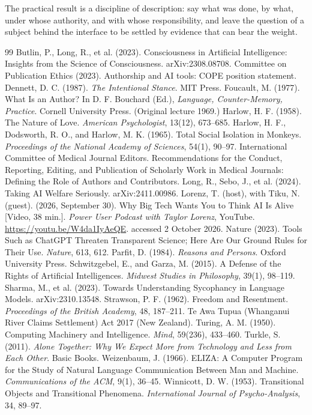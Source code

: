 \documentclass[11pt]{article}
\begin{document}
The practical result is a discipline of description: say what was done, by what, under whose authority, and with whose responsibility, and leave the question of a subject behind the interface to be settled by evidence that can bear the weight.

\begin{thebibliography}{99}\small
\setlength{\itemsep}{0.2em}
 Butlin, P., Long, R., et al. (2023). Consciousness in Artificial Intelligence: Insights from the Science of Consciousness. arXiv:2308.08708.
 Committee on Publication Ethics (2023). Authorship and AI tools: COPE position statement.
 Dennett, D. C. (1987). \emph{The Intentional Stance}. MIT Press.
 Foucault, M. (1977). What Is an Author? In D. F. Bouchard (Ed.), \emph{Language, Counter-Memory, Practice}. Cornell University Press. (Original lecture 1969.)
 Harlow, H. F. (1958). The Nature of Love. \emph{American Psychologist}, 13(12), 673--685.
 Harlow, H. F., Dodsworth, R. O., and Harlow, M. K. (1965). Total Social Isolation in Monkeys. \emph{Proceedings of the National Academy of Sciences}, 54(1), 90--97.
 International Committee of Medical Journal Editors. Recommendations for the Conduct, Reporting, Editing, and Publication of Scholarly Work in Medical Journals: Defining the Role of Authors and Contributors.
 Long, R., Sebo, J., et al. (2024). Taking AI Welfare Seriously. arXiv:2411.00986.
 Lorenz, T. (host), with Tiku, N. (guest). (2026, September 30). Why Big Tech Wants You to Think AI Is Alive [Video, 38 min.]. \emph{Power User Podcast with Taylor Lorenz}, YouTube. \url{https://youtu.be/W4da1IyAeQE}. accessed 2 October 2026.
 Nature (2023). Tools Such as ChatGPT Threaten Transparent Science; Here Are Our Ground Rules for Their Use. \emph{Nature}, 613, 612.
 Parfit, D. (1984). \emph{Reasons and Persons}. Oxford University Press.
 Schwitzgebel, E., and Garza, M. (2015). A Defense of the Rights of Artificial Intelligences. \emph{Midwest Studies in Philosophy}, 39(1), 98--119.
 Sharma, M., et al. (2023). Towards Understanding Sycophancy in Language Models. arXiv:2310.13548.
 Strawson, P. F. (1962). Freedom and Resentment. \emph{Proceedings of the British Academy}, 48, 187--211.
 Te Awa Tupua (Whanganui River Claims Settlement) Act 2017 (New Zealand).
 Turing, A. M. (1950). Computing Machinery and Intelligence. \emph{Mind}, 59(236), 433--460.
 Turkle, S. (2011). \emph{Alone Together: Why We Expect More from Technology and Less from Each Other}. Basic Books.
 Weizenbaum, J. (1966). ELIZA: A Computer Program for the Study of Natural Language Communication Between Man and Machine. \emph{Communications of the ACM}, 9(1), 36--45.
 Winnicott, D. W. (1953). Transitional Objects and Transitional Phenomena. \emph{International Journal of Psycho-Analysis}, 34, 89--97.
\end{thebibliography}
\end{document}
